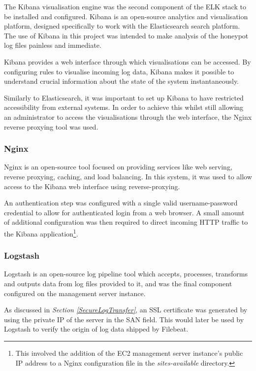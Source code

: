     The Kibana visualisation engine was the second component of the ELK stack to be installed and configured. Kibana is an open-source analytics and visualisation platform, designed specifically to work with the Elasticsearch search platform. The use of Kibana in this project was intended to make analysis of the honeypot log files painless and immediate. 
    
    Kibana provides a web interface through which visualisations can be accessed. By configuring rules to visualise incoming log data, Kibana makes it possible to understand crucial information about the state of the system instantaneously.
    
    Similarly to Elasticsearch, it was important to set up Kibana to have restricted accessibility from external systems. In order to achieve this whilst still allowing an administrator to access the visualisations through the web interface, the Nginx reverse proxying tool was used.
    
		\subsubsection{Nginx}
        
Nginx is an open-source tool focused on providing services like web serving, reverse proxying, caching, and load balancing. \cite{Nginx} In this system, it was used to allow access to the Kibana web interface using reverse-proxying. 

An authentication step was configured with a single valid username-password credential to allow for authenticated login from a web browser. A small amount of additional configuration was then required to direct incoming HTTP traffic to the Kibana application\footnote{This involved the addition of the EC2 management server instance's public IP address to a Nginx  configuration file in the \textit{sites-available} directory.}.
      
	\subsubsection{Logstash}
    Logstash is an open-source log pipeline tool which accepts, processes, transforms and outputs data from log files provided to it, and was the final component configured on the management server instance. 
    
    As discussed in \textit{Section \ref{SecureLogTransfer}}, an SSL certificate was generated by using the private IP of the server in the SAN field. This would later be used by Logstash to verify the origin of log data shipped by Filebeat.
    
